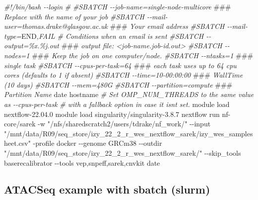 \documentclass[
]{book}
\newenvironment{Shaded}{\begin{snugshade}}{\end{snugshade}}
\newcommand{\AlertTok}[1]{\textcolor[rgb]{0.94,0.16,0.16}{#1}}
\newcommand{\AttributeTok}[1]{\textcolor[rgb]{0.77,0.63,0.00}{#1}}
\newcommand{\CommentTok}[1]{\textcolor[rgb]{0.56,0.35,0.01}{\textit{#1}}}
\newcommand{\ExtensionTok}[1]{#1}
\newcommand{\FunctionTok}[1]{\textcolor[rgb]{0.00,0.00,0.00}{#1}}
\newcommand{\NormalTok}[1]{#1}
\newcommand{\RegionMarkerTok}[1]{#1}
\newcommand{\StringTok}[1]{\textcolor[rgb]{0.31,0.60,0.02}{#1}}
\begin{document}
\begin{Shaded}
\begin{Highlighting}[]
\CommentTok{\#!/bin/bash {-}{-}login}
\CommentTok{\#}
\CommentTok{\#SBATCH {-}{-}job{-}name=single{-}node{-}multicore }\AlertTok{\#\#\#}\CommentTok{ Replace with the name of your job}
\CommentTok{\#SBATCH {-}{-}mail{-}user=thomas.drake@glasgow.ac.uk }\AlertTok{\#\#\#}\CommentTok{ Your email address}
\CommentTok{\#SBATCH {-}{-}mail{-}type=}\RegionMarkerTok{END}\CommentTok{,FAIL \# Conditions when an email is sent}
\CommentTok{\#SBATCH {-}{-}output=\%x.\%j.out }\AlertTok{\#\#\#}\CommentTok{ output file: \textless{}job{-}name.job{-}id.out\textgreater{}}
\CommentTok{\#SBATCH {-}{-}nodes=1 }\AlertTok{\#\#\#}\CommentTok{ Keep the job on one computer/node.}
\CommentTok{\#SBATCH {-}{-}ntasks=1 }\AlertTok{\#\#\#}\CommentTok{ single task}
\CommentTok{\#SBATCH {-}{-}cpus{-}per{-}task=64  }\AlertTok{\#\#\#}\CommentTok{ each task uses up to 64 cpu cores (defaults to 1 if absent)}
\CommentTok{\#SBATCH {-}{-}time=10{-}00:00:00 }\AlertTok{\#\#\#}\CommentTok{ WallTime (10 days)}
\CommentTok{\#SBATCH {-}{-}mem=480G}
\CommentTok{\#SBATCH {-}{-}partition=compute }\AlertTok{\#\#\#}\CommentTok{ Partition Name}
\FunctionTok{date}
\FunctionTok{hostname}
\CommentTok{\# Set OMP\_NUM\_THREADS to the same value as {-}{-}cpus{-}per{-}task}
\CommentTok{\# with a fallback option in case it isn\textquotesingle{}t set.}
\ExtensionTok{module}\NormalTok{ load nextflow{-}22.04.0}
\ExtensionTok{module}\NormalTok{ load singularity/singularity{-}3.8.7}
\ExtensionTok{nextflow}\NormalTok{ run nf{-}core/sarek }\AttributeTok{{-}w} \StringTok{"/nfs/sharedscratch2/users/tdrake/nf\_work/"} \AttributeTok{{-}{-}input} \StringTok{"/mnt/data/R09/seq\_store/izy\_22\_2\_r\_wes\_nextflow\_sarek/izy\_wes\_samplesheet.csv"}  \AttributeTok{{-}profile}\NormalTok{ docker }\AttributeTok{{-}{-}genome}\NormalTok{ GRCm38 }\AttributeTok{{-}{-}outdir} \StringTok{"/mnt/data/R09/seq\_store/izy\_22\_2\_r\_wes\_nextflow\_sarek/"} \AttributeTok{{-}{-}skip\_tools}\NormalTok{ baserecalibrator }\AttributeTok{{-}{-}tools}\NormalTok{ vep,snpeff,sarek,cnvkit}
\FunctionTok{date}
\end{Highlighting}
\end{Shaded}

\hypertarget{atacseq-example-with-sbatch-slurm}{%
\subsection{ATACSeq example with sbatch (slurm)}\label{atacseq-example-with-sbatch-slurm}}
\end{document}
